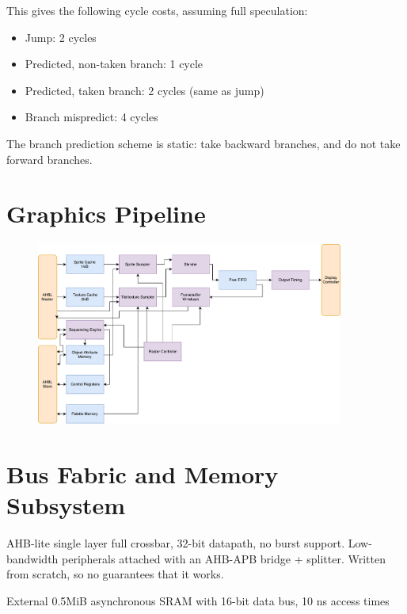 \documentclass{article}
\begin{document}
This gives the following cycle costs, assuming full speculation:
\begin{itemize}
\item Jump: 2 cycles
\item Predicted, non-taken branch: 1 cycle
\item Predicted, taken branch: 2 cycles (same as jump)
\item Branch mispredict: 4 cycles
\end{itemize}

The branch prediction scheme is static: take backward branches, and do not take forward branches.

\section{Graphics Pipeline}

\begin{figure}[!htb]
\centering
\includegraphics[width=0.9\textwidth]{diagrams/graphics.pdf}
\end{figure}

\section{Bus Fabric and Memory Subsystem}

AHB-lite single layer full crossbar, 32-bit datapath, no burst support. Low-bandwidth peripherals attached with an AHB-APB bridge + splitter. Written from scratch, so no guarantees that it works.

External 0.5MiB asynchronous SRAM with 16-bit data bus, 10 ns access times
\end{document}
